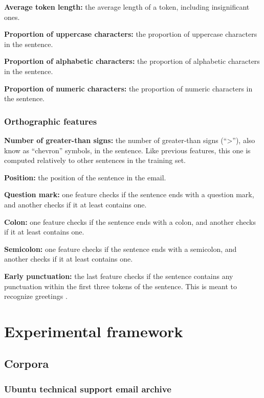 \documentclass[11pt]{article}
\begin{document}
\textbf{Average token length:} the average length of a token, including insignificant ones.

\textbf{Proportion of uppercase characters:} the proportion of uppercase characters in the sentence.

\textbf{Proportion of alphabetic characters:} the proportion of alphabetic characters in the sentence.

\textbf{Proportion of numeric characters:} the proportion of numeric characters in the sentence.

\subsubsection{Orthographic features}

\textbf{Number of greater-than signs:} the number of greater-than signs (``>''), also know as ``chevron'' symbols, in the sentence. Like previous features, this one is computed relatively to other sentences in the training set.

\textbf{Position:} the position of the sentence in the email.

\textbf{Question mark:} one feature checks if the sentence ends with a question mark, and another checks if it at least contains one.

\textbf{Colon:} one feature checks if the sentence ends with a colon, and another checks if it at least contains one.

\textbf{Semicolon:} one feature checks if the sentence ends with a semicolon, and another checks if it at least contains one.

\textbf{Early punctuation:} the last feature checks if the sentence contains any punctuation within the first three tokens of the sentence. This is meant to recognize greetings \cite{qadir2011classifying}.

\section{Experimental framework}

\subsection{Corpora}

\subsubsection{Ubuntu technical support email archive}
\end{document}

